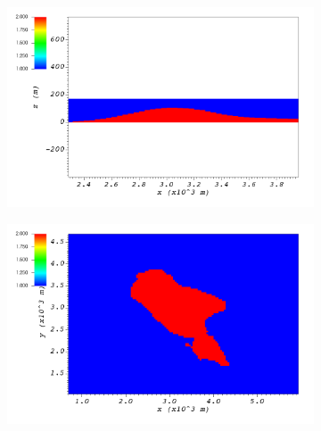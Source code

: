\documentclass[14pt,landscape]{report}
\begin{document}
\begin{figure}[p]
\centering
    \begin{subfigure}[t]{0.45\textwidth}
    \includegraphics[width=\textwidth,keepaspectratio]{Images/askervein_y_3000_icell.png}
    \caption{}
    \end{subfigure}
	\begin{subfigure}[t]{0.45\textwidth}
    \includegraphics[width=\textwidth,keepaspectratio]{Images/askervein_z_20_icell.png}
    \caption{}
    \end{subfigure}
\end{figure}
\end{document}
